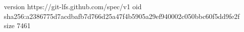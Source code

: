 version https://git-lfs.github.com/spec/v1
oid sha256:a2386775d7acdbafb7d766d25a47f4b5905a29ef940002c050bbc60f5dd9fe2f
size 7461
